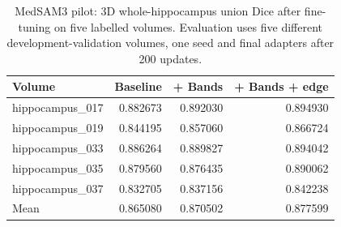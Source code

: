 \begin{table}[htbp]
\centering\small
\begin{tabular}{lrrr}
\toprule
Volume & Baseline & + Bands & + Bands + edge\\
\midrule
hippocampus\_017 & 0.882673 & 0.892030 & 0.894930 \\
hippocampus\_019 & 0.844195 & 0.857060 & 0.866724 \\
hippocampus\_033 & 0.886264 & 0.889827 & 0.894042 \\
hippocampus\_035 & 0.879560 & 0.876435 & 0.890062 \\
hippocampus\_037 & 0.832705 & 0.837156 & 0.842238 \\
\midrule
Mean & 0.865080 & 0.870502 & 0.877599 \\
\bottomrule
\end{tabular}
\caption{MedSAM3 pilot: 3D whole-hippocampus union Dice after fine-tuning on five labelled volumes. Evaluation uses five different development-validation volumes, one seed and final adapters after 200 updates.}\label{tab:medsam}
\end{table}
